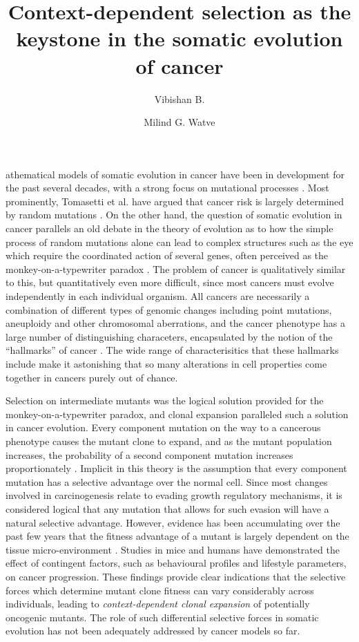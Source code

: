 \documentclass[9pt,twocolumn,twoside]{pnas-new}
\title{Context-dependent selection as the keystone in the somatic evolution of cancer}
\author[1,2]{Vibishan B.}
\author[1,2,*]{Milind G. Watve}
\affil[1]{Department of Biology, Indian Institute of Science Education and Research (IISER), Dr. Homi Bhabha Road, Pune, India-411008}
\begin{document}
\maketitle
\thispagestyle{firststyle}

athematical models of somatic evolution in cancer have been in development for the past several decades, with a strong focus on mutational processes \cite{ARMITAGE1954, McFarland2013, Blokzijl2016, Mina2017}. Most prominently, Tomasetti et al. have argued that cancer risk is largely determined by random mutations \cite{Tomasetti78, Tomasetti2017}. On the other hand, the question of somatic evolution in cancer parallels an old debate in the theory of evolution as to how the simple process of random mutations alone can lead to complex structures such as the eye which require the coordinated action of several genes, often perceived as the monkey-on-a-typewriter paradox \cite{Dawkins1996}. The problem of cancer is qualitatively similar to this, but quantitatively even more difficult, since most cancers must evolve independently in each individual organism. All cancers are necessarily a combination of different types of genomic changes including point mutations, aneuploidy and other chromosomal aberrations, and the cancer phenotype has a large number of distinguishing characeters, encapsulated by the notion of the ``hallmarks'' of cancer \cite{Hanahan2000, Schafer2008, Hanahan2011}. The wide range of characterisitics that these hallmarks include make it astonishing that so many alterations in cell properties come together in cancers purely out of chance.

Selection on intermediate mutants was the logical solution provided for the monkey-on-a-typewriter paradox, and clonal expansion paralleled such a solution in cancer evolution. Every component mutation on the way to a cancerous phenotype causes the mutant clone to expand, and as the mutant population increases, the probability of a second component mutation increases proportionately \cite{Nowell1976}. Implicit in this theory is the assumption that every component mutation has a selective advantage over the normal cell. Since most changes involved in carcinogenesis relate to evading growth regulatory mechanisms, it is considered logical that any mutation that allows for such evasion will have a natural selective advantage. However, evidence has been accumulating over the past few years that the fitness advantage of a mutant is largely dependent on the tissue micro-environment \cite{Hanahan2012, Pietras2010}. Studies in mice \cite{Cao2010} and humans \cite{Rundqvist2013} have demonstrated the effect of contingent factors, such as behavioural profiles and lifestyle parameters, on cancer progression. These findings provide clear indications that the selective forces which determine mutant clone fitness can vary considerably across individuals, leading to \textit{context-dependent clonal expansion} of potentially oncogenic mutants. The role of such differential selective forces in somatic evolution has not been adequately addressed by cancer models so far.
\end{document}

